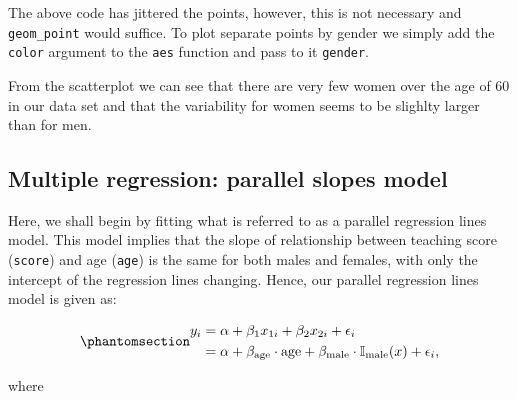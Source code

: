 \documentclass[
  letterpaper,
  DIV=11,
  numbers=noendperiod]{scrartcl}
\begin{document}
\begin{tcolorbox}[enhanced jigsaw, colback=white, toptitle=1mm, bottomrule=.15mm, colbacktitle=quarto-callout-note-color!10!white, breakable, title=\textcolor{quarto-callout-note-color}{\faInfo}\hspace{0.5em}{Note}, colframe=quarto-callout-note-color-frame, opacitybacktitle=0.6, toprule=.15mm, arc=.35mm, coltitle=black, leftrule=.75mm, bottomtitle=1mm, titlerule=0mm, opacityback=0, rightrule=.15mm, left=2mm]

The above code has jittered the points, however, this is not necessary
and \texttt{geom\_point} would suffice. To plot separate points by
gender we simply add the \texttt{color} argument to the \texttt{aes}
function and pass to it \texttt{gender}.

\end{tcolorbox}

From the scatterplot we can see that there are very few women over the
age of 60 in our data set and that the variability for women seems to be
slighlty larger than for men.

\subsection{Multiple regression: parallel slopes
model}\label{multiple-regression-parallel-slopes-model}

Here, we shall begin by fitting what is referred to as a parallel
regression lines model. This model implies that the slope of
relationship between teaching score (\texttt{score}) and age
(\texttt{age}) is the same for both males and females, with only the
intercept of the regression lines changing. Hence, our parallel
regression lines model is given as:

\begin{equation}\phantomsection\label{eq-parallel.lm}{
\begin{aligned}
y_{i} &= \alpha + \beta_1 x_{1i} + \beta_2 x_{2i} + \epsilon_i \nonumber \\&= \alpha + \beta_{\text{age}} \cdot \text{age} + \beta_{\text{male}} \cdot \mathbb{I}_{\text{male}}(x) + \epsilon_i, 
\end{aligned}
}\end{equation}

where
\end{document}
